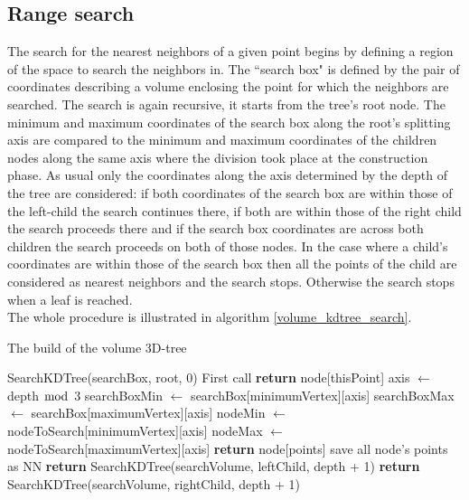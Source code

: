 \subsection{Range search}
The search for the nearest neighbors of a given point begins by defining a region of the space to search the neighbors in.
The ``search box" is defined by the pair of coordinates describing a volume enclosing the point for which the neighbors are searched. The search is again recursive, it starts from the tree's root node. The minimum and maximum coordinates of the search box along the root's splitting axis are compared to the minimum and maximum coordinates of the children nodes along the same axis where the division took place at the construction phase. As usual only the coordinates along the axis determined by the depth of the tree are considered: if both coordinates of the search box are within those of the left-child  the search continues there, if both are within those of the right child the search proceeds there and if the search box coordinates are across both children the search proceeds on both of those nodes. In the case where a child's coordinates are within those of the search box then all the points of the child are considered as nearest neighbors and the search stops. Otherwise the search stops when a leaf is reached.\\
The whole procedure is illustrated in algorithm \ref{volume_kdtree_search}.\\
\begin{algorithm}
\caption{The build of the volume 3D-tree}
\label{volume_kdtree_search}
\begin{algorithmic}
\State SearchKDTree(searchBox, root, 0) \Comment First call
    \State \textbf{return} node[thisPoint]
  \EndIf
  \State axis $\gets$ depth $\bmod$ 3
  \State searchBoxMin $\gets$ searchBox[minimumVertex][axis]
  \State searchBoxMax $\gets$ searchBox[maximumVertex][axis]
  \State nodeMin $\gets$ nodeToSearch[minimumVertex][axis]
  \State nodeMax $\gets$ nodeToSearch[maximumVertex][axis]
  \State \textbf{return} node[points] \Comment save all node's points as NN
  \Else
  	  \State \textbf{return} SearchKDTree(searchVolume, leftChild, depth + 1)
  	\EndIf
 	  \State \textbf{return} SearchKDTree(searchVolume, rightChild, depth + 1)
	\EndIf
  \EndIf
\EndProcedure
\end{algorithmic}
\end{algorithm}

